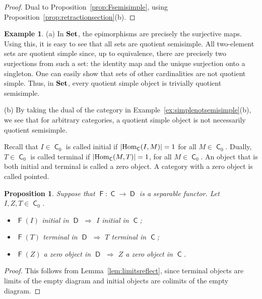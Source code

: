 \documentclass[12pt]{amsart}
\newtheorem{prop}[thm]{Proposition}
\theoremstyle{definition}
\newtheorem{exa}[thm]{Example}
\newcommand{\Set}{{\bf Set}}
\newcommand{\Hom}{{\rm Hom}}
\DeclareMathOperator{\C}{\mathsf C}
\DeclareMathOperator{\D}{\mathsf D}
\DeclareMathOperator{\F}{\mathsf F}
\begin{document}
\begin{proof}
Dual to Proposition~\ref{prop:Fsemisimple}, using Proposition~\ref{prop:retractionsection}(b). %
\end{proof}

\begin{exa}
(a) In $\Set$, the epimorphisms are
precisely the surjective maps.
Using this, it is easy to see that
all sets are quotient semisimple. 
All two-element sets are quotient simple since, up to equivalence, there are precisely two surjections from such a set: the identity map and the unique surjection onto a singleton.
One can easily show that sets 
of other cardinalities are not
quotient simple.
Thus, in $\Set$, every quotient simple
object is trivially quotient semisimple.

(b) By taking the dual of the category in
Example~\ref{ex:simplenotsemisimple}(b), 
we see that for arbitrary categories,
a quotient simple object is not  
necessarily quotient semisimple.
\end{exa}

Recall that $I \in \C_0$ is called 
initial if
$|\Hom_{\C}(I,M)|=1$ for all $M \in \C_0$. 
Dually, \(T \in \C_0\) is called 
terminal if $|\Hom_{\C}(M,T)|=1$,
for all $M \in \C_0$.
An object that is 
both initial and terminal is called a 
zero object. 
A category with a zero object is called 
pointed.

\begin{prop}
Suppose that $\F : \C \to \D$ is a separable
functor. Let $I,Z,T \in \C_0$. 
\begin{itemize}[widest=(a)]

\item[{\rm (a)}] $\F(I)$ initial
in $\D$ $\Longrightarrow$ $I$ initial in $\C$;

\item[{\rm (b)}] $\F(T)$ terminal
in $\D$ $\Longrightarrow$ 
$T$ terminal in $\C$;

\item[{\rm (c)}] $\F(Z)$ a 
zero object in $\D$ $\Longrightarrow$ 
$Z$ a zero object in $\C$.

\end{itemize}
\end{prop}

\begin{proof}
This follows from Lemma~\ref{lem:limitsreflect}, 
since terminal objects are limits of the empty diagram 
and initial objects are colimits of the empty diagram.
\end{proof}
\end{document}
